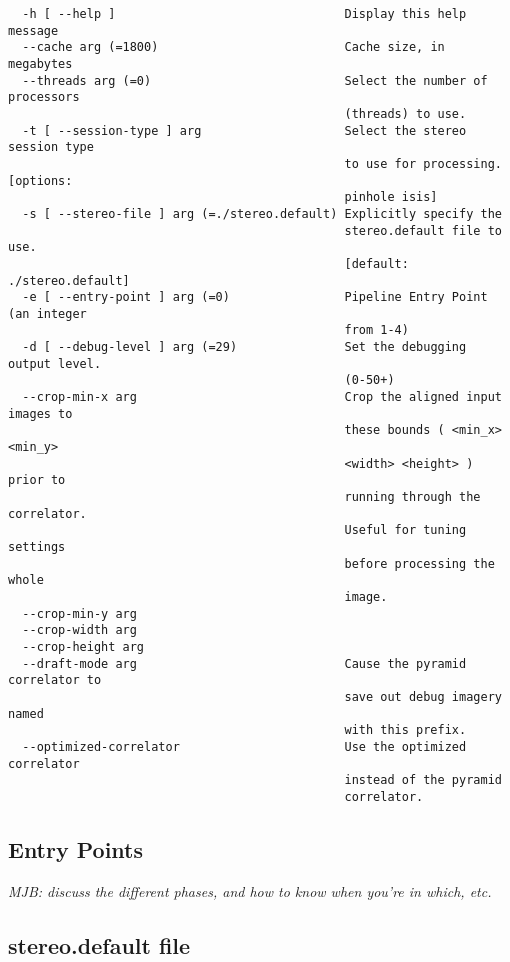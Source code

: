 \begin{verbatim}
  -h [ --help ]                                Display this help message
  --cache arg (=1800)                          Cache size, in megabytes
  --threads arg (=0)                           Select the number of processors 
                                               (threads) to use.
  -t [ --session-type ] arg                    Select the stereo session type 
                                               to use for processing. [options:
                                               pinhole isis]
  -s [ --stereo-file ] arg (=./stereo.default) Explicitly specify the 
                                               stereo.default file to use. 
                                               [default: ./stereo.default]
  -e [ --entry-point ] arg (=0)                Pipeline Entry Point (an integer
                                               from 1-4)
  -d [ --debug-level ] arg (=29)               Set the debugging output level. 
                                               (0-50+)
  --crop-min-x arg                             Crop the aligned input images to
                                               these bounds ( <min_x> <min_y> 
                                               <width> <height> ) prior to 
                                               running through the correlator. 
                                               Useful for tuning settings 
                                               before processing the whole 
                                               image.
  --crop-min-y arg
  --crop-width arg
  --crop-height arg
  --draft-mode arg                             Cause the pyramid correlator to 
                                               save out debug imagery named 
                                               with this prefix.
  --optimized-correlator                       Use the optimized correlator 
                                               instead of the pyramid 
                                               correlator.
\end{verbatim}

\subsection{Entry Points}

\emph{MJB: discuss the different phases, and how to know when you're
in which, etc.}

\subsection{stereo.default file}

